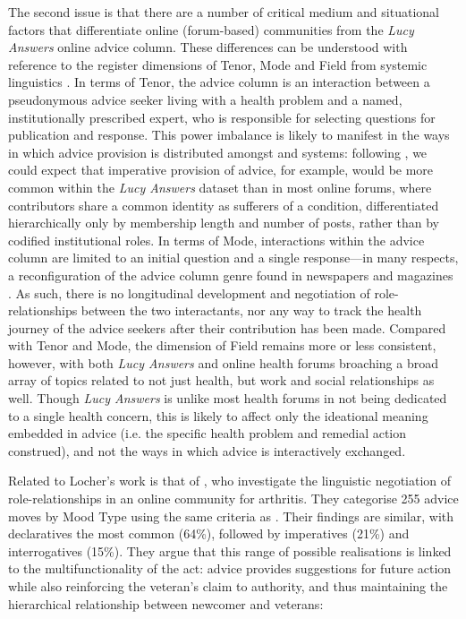 The second issue is that there are a number of critical medium and situational factors that differentiate online (forum\hyp{}based) communities from the \emph{Lucy Answers} online advice column. These differences can be understood with reference to the register dimensions of Tenor, Mode and Field from systemic linguistics \cite{halliday_language_1989}. In terms of Tenor, the advice column is an interaction between a pseudonymous advice seeker living with a health problem and a named, institutionally prescribed expert, who is responsible for selecting questions for publication and response. This power imbalance is likely to manifest in the ways in which advice provision is distributed amongst  and  systems: following \textcite{decapua_`if_1995}, we could expect that imperative provision of advice, for example, would be more common within the \emph{Lucy Answers} dataset than in most online \glspl{forum}, where contributors share a common identity as sufferers of a condition, differentiated hierarchically only by membership length and number of \glspl{post}, rather than by codified institutional roles. In terms of Mode, interactions within the advice column are limited to an initial question and a single response---in many respects, a reconfiguration of the advice column genre found in newspapers and magazines \cite[see][]{herring_discourse_2011}. As such, there is no longitudinal development and negotiation of role\hyp{}relationships between the two interactants, nor any way to track the health journey of the advice seekers after their contribution has been made. Compared with Tenor and Mode, the dimension of Field remains more or less consistent, however, with both \emph{Lucy Answers} and online health \glspl{forum} broaching a broad array of topics related to not just health, but work and social relationships as well. Though \emph{Lucy Answers} is unlike most health \glspl{forum} in not being dedicated to a single health concern, this is likely to affect only the ideational meaning embedded in advice (i.e. the specific health problem and remedial action construed), and not the ways in which advice is interactively exchanged.

Related to Locher's work is that of \textcite{harrison2009politeness}, who investigate the linguistic negotiation of role\hyp{}relationships in an online community for arthritis. They categorise 255 advice moves by Mood Type using the same criteria as \textcite{locher2006advice}. Their findings are similar, with declaratives the most common (64\%), followed by imperatives (21\%) and interrogatives (15\%). They argue that this range of possible realisations is linked to the multifunctionality of the act: advice provides suggestions for future action while also reinforcing the veteran's claim to authority, and thus maintaining the hierarchical relationship between newcomer and veterans:

